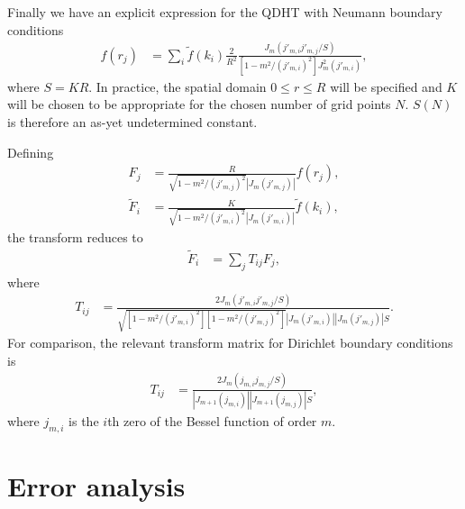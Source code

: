\documentclass[aip,amsmath,amssymb,reprint,twocolumn]{revtex4-1}
\newcommand{\abs}[1]{\left|#1\right|}
\begin{document}
Finally we have an explicit expression for the QDHT with Neumann boundary conditions
\begin{align}
  f(r_j) &= \sum_i \tilde{f}(k_i) \frac{2}{R^2} \frac{J_m\left(j'_{m,i} j'_{m,j}/S\right)}{\left[1-m^2/(j'_{m,i})^2\right]J_m^2(j'_{m,i})},
\end{align}
where $S = K R$.  In practice, the spatial domain $0 \leq r \leq R$ will be specified and $K$ will be chosen to be appropriate for the chosen number of grid points $N$.  $S(N)$ is therefore an as-yet undetermined constant.

\begin{widetext}
Defining
\begin{align}
    F_j &= \frac{R}{\sqrt{1-m^2/(j'_{m,j})^2} \abs{J_m(j'_{m,j})}} f(r_j), \\
    \tilde{F}_i &= \frac{K}{\sqrt{1-m^2/(j'_{m,i})^2} \abs{J_m(j'_{m,i})}}  \tilde{f}(k_i),
\end{align}
the transform reduces to
\begin{align}
    \tilde{F}_i &= \sum_j T_{ij} F_j,
\end{align}
where
\begin{align}
    T_{ij} &= \frac{2 J_m(j'_{m,i} j'_{m,j}/S)}{\sqrt{\left[1-m^2/(j'_{m,i})^2\right]\left[1-m^2/(j'_{m,j})^2\right]} \abs{J_m(j'_{m,i})} \abs{J_m(j'_{m,j})} S}.
\end{align}
For comparison, the relevant transform matrix for Dirichlet boundary conditions is\citep{Guizar-Sicairos:2004}
\begin{align}
  T_{ij} &= \frac{2 J_m(j_{m,i} j_{m,j}/S)}{\abs{J_{m+1}(j_{m,i})} \abs{J_{m+1}(j_{m,j})} S},
\end{align}
where $j_{m,i}$ is the $i$th zero of the Bessel function of order $m$.
\end{widetext}


\section{Error analysis}
\label{sec:ErrorAnalysis}
\end{document}
